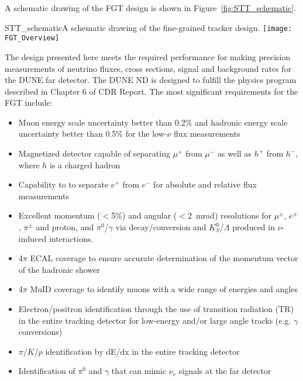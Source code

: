 A schematic drawing of the FGT design is shown in
Figure~\ref{fig:STT_schematic}.
\begin{cdrfigure}{STT_schematic}{A schematic drawing of the fine-grained tracker design.}
\texttt{[image: FGT\_Overview]}
\end{cdrfigure}
The design presented here meets the required performance for making
precision measurements of neutrino fluxes, cross sections, signal and
background rates for the DUNE far detector.  The DUNE ND is designed
to fulfill the physics program described in Chapter 6 of CDR \volphys
Report\cite{DPR}. The most significant
requirements\cite{ND-REQ1,ND-REQ2} for the FGT include:
\begin{itemize}
\item Muon energy scale uncertainty better than 0.2\% and hadronic
  energy scale uncertainty better than 0.5\% for the low-$\nu$ flux
  measurements
\item Magnetized detector capable of separating $\mu^+$
  from $\mu^-$ as well as $h^+$ from $h^-$, where $h$ is a charged
  hadron
\item Capability to to separate $e^+$ from $e^-$ for absolute and
  relative flux measurements
\item Excellent momentum ($<$5\%) and angular ($<2$~mrad) resolutions
  for $\mu^{\pm}$, $e^{\pm}$, $\pi^{\pm}$ and proton, and
  $\pi^0$/$\gamma$ via decay/conversion and $K^0_S$/$\Lambda$
  produced in $\nu$-induced interactions.
\item 4$\pi$ ECAL coverage to ensure accurate determination of the
  momentum vector of the hadronic shower
\item 4$\pi$ MuID coverage to identify muons with a wide range of
  energies and angles
\item Electron/positron identification through the use of transition
  radiation (TR) in the entire tracking detector for low-energy and/or
  large angle tracks (e.g. $\gamma$ conversions)
\item $\pi/K/p$ identification by dE/dx in the entire tracking
  detector
\item Identification of $\pi^0$ and $\gamma$ that can mimic
  $\nu_e$ signals at the far detector

\end{itemize}
